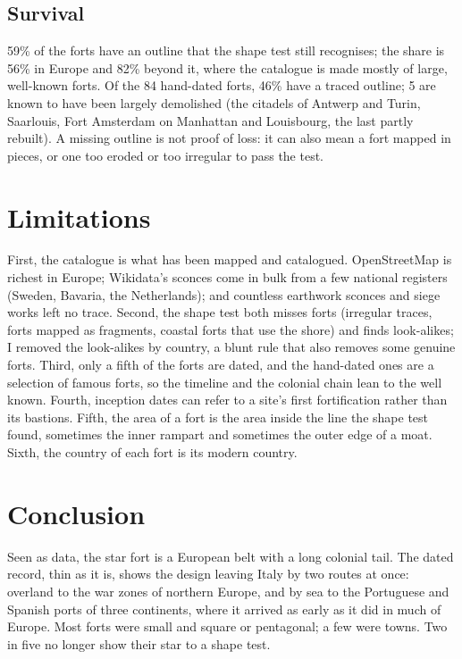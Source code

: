 \documentclass[11pt,a4paper]{article}
\begin{document}
\subsection{Survival}
59\% of the forts have an outline that the shape test still recognises; the share is 56\% in Europe and 82\% beyond it, where the catalogue is made mostly of large, well-known forts. Of the 84 hand-dated forts, 46\% have a traced outline; 5 are known to have been largely demolished (the citadels of Antwerp and Turin, Saarlouis, Fort Amsterdam on Manhattan and Louisbourg, the last partly rebuilt). A missing outline is not proof of loss: it can also mean a fort mapped in pieces, or one too eroded or too irregular to pass the test.

\section{Limitations}
First, the catalogue is what has been mapped and catalogued. OpenStreetMap is richest in Europe; Wikidata's sconces come in bulk from a few national registers (Sweden, Bavaria, the Netherlands); and countless earthwork sconces and siege works left no trace. Second, the shape test both misses forts (irregular traces, forts mapped as fragments, coastal forts that use the shore) and finds look-alikes; I removed the look-alikes by country, a blunt rule that also removes some genuine forts. Third, only a fifth of the forts are dated, and the hand-dated ones are a selection of famous forts, so the timeline and the colonial chain lean to the well known. Fourth, inception dates can refer to a site's first fortification rather than its bastions. Fifth, the area of a fort is the area inside the line the shape test found, sometimes the inner rampart and sometimes the outer edge of a moat. Sixth, the country of each fort is its modern country.

\section{Conclusion}
Seen as data, the star fort is a European belt with a long colonial tail. The dated record, thin as it is, shows the design leaving Italy by two routes at once: overland to the war zones of northern Europe, and by sea to the Portuguese and Spanish ports of three continents, where it arrived as early as it did in much of Europe. Most forts were small and square or pentagonal; a few were towns. Two in five no longer show their star to a shape test.
\end{document}
